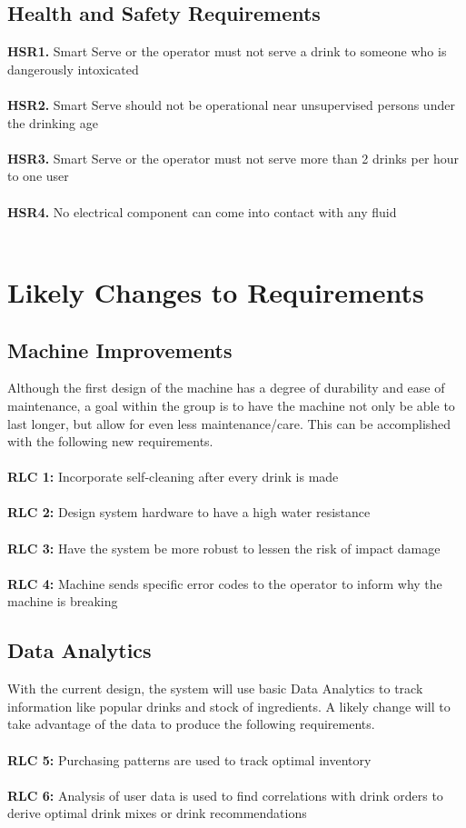 \documentclass{article}
\begin{document}
\subsection{Health and Safety Requirements}
    \noindent\textbf{HSR1.} Smart Serve or the operator must not serve a drink to someone who is dangerously intoxicated \\\\
    \textbf{HSR2.} Smart Serve should not be operational near unsupervised persons under the drinking age \\\\
    \textbf{HSR3.} Smart Serve or the operator must not serve more than 2 drinks per hour to one user \\\\
    \textbf{HSR4.} No electrical component can come into contact with any fluid \\\\

\section{Likely Changes to Requirements}
\subsection{Machine Improvements}
    \noindent Although the first design of the machine has a degree of durability and ease of maintenance, a goal within the group is to have the machine not only be able to last longer, but allow for even less maintenance/care. This can be accomplished with the following new requirements. \\\\
    \textbf{RLC 1:} Incorporate self-cleaning after every drink is made\\\\
    \textbf{RLC 2:} Design system hardware to have a high water resistance\\\\
    \textbf{RLC 3:} Have the system be more robust to lessen the risk of impact damage\\\\
    \textbf{RLC 4:} Machine sends specific error codes to the operator to inform why the machine is breaking\\
\subsection{Data Analytics}
    \noindent With the current design, the system will use basic Data Analytics to track information like popular drinks and stock of ingredients. A likely change will to take advantage of the data to produce the following requirements. \\\\
    \textbf{RLC 5:} Purchasing patterns are used to track optimal inventory \\\\
    \textbf{RLC 6:} Analysis of user data is used to find correlations with drink orders to derive optimal drink mixes or drink recommendations\\\\
\end{document}
